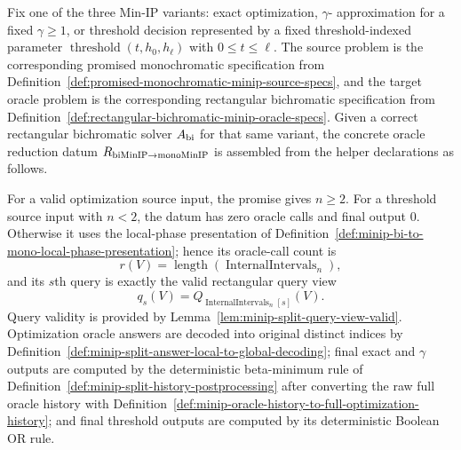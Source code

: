 \begin{definition}
  \label{def:minip-bi-to-mono-reduction-datum}
  Fix one of the three Min-IP variants: exact optimization, $\gamma$-
  approximation for a fixed $\gamma\geq1$, or threshold decision represented
  by a fixed threshold-indexed parameter
  $\operatorname{threshold}(t,h_0,h_\ell)$ with $0\leq t\leq\ell$.  The source
  problem is the corresponding promised
  monochromatic specification from
  Definition~\ref{def:promised-monochromatic-minip-source-specs}, and the
  target oracle problem is the corresponding rectangular bichromatic
  specification from
  Definition~\ref{def:rectangular-bichromatic-minip-oracle-specs}.  Given a
  correct rectangular bichromatic solver $A_{\rm bi}$ for that same variant,
  the concrete oracle reduction datum
  $R_{\rm biMinIP\to monoMinIP}$ is assembled from the helper declarations as
  follows.

  For a valid optimization source input, the promise gives $n\geq2$.  For a
  threshold source input with $n<2$, the datum has zero oracle calls and final
  output $0$.  Otherwise it uses the local-phase presentation of
  Definition~\ref{def:minip-bi-to-mono-local-phase-presentation}; hence its
  oracle-call count is
  \[
    r(V)=\operatorname{length}(\operatorname{InternalIntervals}_n),
  \]
  and its $s$th query is exactly the valid rectangular query view
  \[
    q_s(V)=Q_{\operatorname{InternalIntervals}_n[s]}(V).
  \]
  Query validity is provided by
  Lemma~\ref{lem:minip-split-query-view-valid}.  Optimization oracle answers
  are decoded into original distinct indices by
  Definition~\ref{def:minip-split-answer-local-to-global-decoding}; final
  exact and $\gamma$ outputs are computed by the deterministic beta-minimum
  rule of Definition~\ref{def:minip-split-history-postprocessing} after
  converting the raw full oracle history with
  Definition~\ref{def:minip-oracle-history-to-full-optimization-history}; and
  final threshold outputs are computed by its deterministic Boolean OR rule.


\end{definition}
